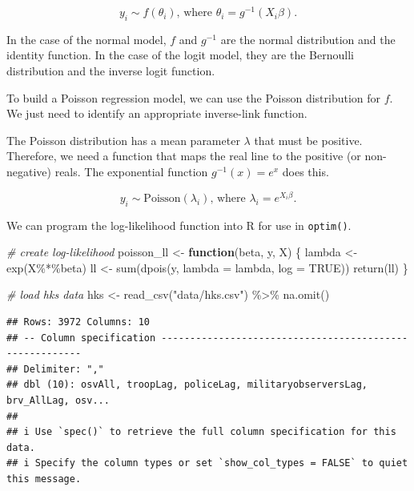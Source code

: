 \documentclass[
]{book}
\newenvironment{Shaded}{\begin{snugshade}}{\end{snugshade}}
\newcommand{\AttributeTok}[1]{\textcolor[rgb]{0.77,0.63,0.00}{#1}}
\newcommand{\CommentTok}[1]{\textcolor[rgb]{0.56,0.35,0.01}{\textit{#1}}}
\newcommand{\ConstantTok}[1]{\textcolor[rgb]{0.00,0.00,0.00}{#1}}
\newcommand{\ControlFlowTok}[1]{\textcolor[rgb]{0.13,0.29,0.53}{\textbf{#1}}}
\newcommand{\FunctionTok}[1]{\textcolor[rgb]{0.00,0.00,0.00}{#1}}
\newcommand{\NormalTok}[1]{#1}
\newcommand{\OtherTok}[1]{\textcolor[rgb]{0.56,0.35,0.01}{#1}}
\newcommand{\SpecialCharTok}[1]{\textcolor[rgb]{0.00,0.00,0.00}{#1}}
\newcommand{\StringTok}[1]{\textcolor[rgb]{0.31,0.60,0.02}{#1}}
\begin{document}
\[
y_i \sim f(\theta_i)\text{, where } \theta_i = g^{-1}(X_i\beta).
\]

In the case of the normal model, \(f\) and \(g^{-1}\) are the normal
distribution and the identity function. In the case of the logit model,
they are the Bernoulli distribution and the inverse logit function.

To build a Poisson regression model, we can use the Poisson distribution
for \(f\). We just need to identify an appropriate inverse-link
function.

The Poisson distribution has a mean parameter \(\lambda\) that must be
positive. Therefore, we need a function that maps the real line to the
positive (or non-negative) reals. The exponential function
\(g^{-1}(x) = e^x\) does this.

\[
y_i \sim \text{Poisson}(\lambda_i)\text{, where } \lambda_i = e^{X_i\beta}.
\]

We can program the log-likelihood function into R for use in
\texttt{optim()}.

\begin{Shaded}
\begin{Highlighting}[]
\CommentTok{\# create log{-}likelihood}
\NormalTok{poisson\_ll }\OtherTok{\textless{}{-}} \ControlFlowTok{function}\NormalTok{(beta, y, X) \{}
\NormalTok{  lambda }\OtherTok{\textless{}{-}} \FunctionTok{exp}\NormalTok{(X}\SpecialCharTok{\%*\%}\NormalTok{beta)}
\NormalTok{  ll }\OtherTok{\textless{}{-}} \FunctionTok{sum}\NormalTok{(}\FunctionTok{dpois}\NormalTok{(y, }\AttributeTok{lambda =}\NormalTok{ lambda, }\AttributeTok{log =} \ConstantTok{TRUE}\NormalTok{))}
  \FunctionTok{return}\NormalTok{(ll)}
\NormalTok{\}}

\CommentTok{\# load hks data}
\NormalTok{hks }\OtherTok{\textless{}{-}} \FunctionTok{read\_csv}\NormalTok{(}\StringTok{"data/hks.csv"}\NormalTok{) }\SpecialCharTok{\%\textgreater{}\%}
  \FunctionTok{na.omit}\NormalTok{()}
\end{Highlighting}
\end{Shaded}

\begin{verbatim}
## Rows: 3972 Columns: 10
## -- Column specification --------------------------------------------------------
## Delimiter: ","
## dbl (10): osvAll, troopLag, policeLag, militaryobserversLag, brv_AllLag, osv...
## 
## i Use `spec()` to retrieve the full column specification for this data.
## i Specify the column types or set `show_col_types = FALSE` to quiet this message.
\end{verbatim}
\end{document}

